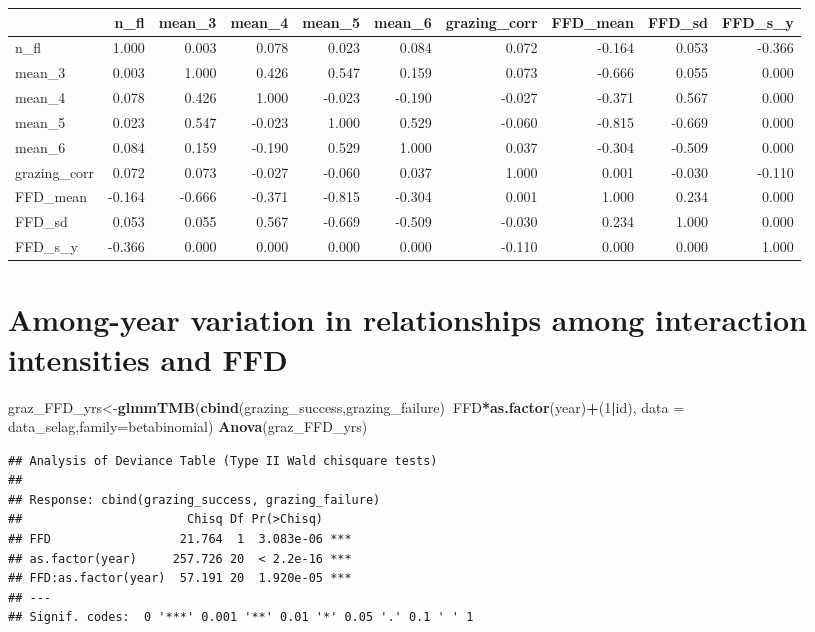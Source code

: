 \documentclass[
]{article}
\newenvironment{Shaded}{\begin{snugshade}}{\end{snugshade}}
\newcommand{\DataTypeTok}[1]{\textcolor[rgb]{0.13,0.29,0.53}{#1}}
\newcommand{\DecValTok}[1]{\textcolor[rgb]{0.00,0.00,0.81}{#1}}
\newcommand{\KeywordTok}[1]{\textcolor[rgb]{0.13,0.29,0.53}{\textbf{#1}}}
\newcommand{\NormalTok}[1]{#1}
\newcommand{\OperatorTok}[1]{\textcolor[rgb]{0.81,0.36,0.00}{\textbf{#1}}}
\begin{document}
\begin{longtable}[]{@{}lrrrrrrrrr@{}}
\toprule
& n\_fl & mean\_3 & mean\_4 & mean\_5 & mean\_6 & grazing\_corr &
FFD\_mean & FFD\_sd & FFD\_s\_y\tabularnewline
\midrule
\endhead
n\_fl & 1.000 & 0.003 & 0.078 & 0.023 & 0.084 & 0.072 & -0.164 & 0.053 &
-0.366\tabularnewline
mean\_3 & 0.003 & 1.000 & 0.426 & 0.547 & 0.159 & 0.073 & -0.666 & 0.055
& 0.000\tabularnewline
mean\_4 & 0.078 & 0.426 & 1.000 & -0.023 & -0.190 & -0.027 & -0.371 &
0.567 & 0.000\tabularnewline
mean\_5 & 0.023 & 0.547 & -0.023 & 1.000 & 0.529 & -0.060 & -0.815 &
-0.669 & 0.000\tabularnewline
mean\_6 & 0.084 & 0.159 & -0.190 & 0.529 & 1.000 & 0.037 & -0.304 &
-0.509 & 0.000\tabularnewline
grazing\_corr & 0.072 & 0.073 & -0.027 & -0.060 & 0.037 & 1.000 & 0.001
& -0.030 & -0.110\tabularnewline
FFD\_mean & -0.164 & -0.666 & -0.371 & -0.815 & -0.304 & 0.001 & 1.000 &
0.234 & 0.000\tabularnewline
FFD\_sd & 0.053 & 0.055 & 0.567 & -0.669 & -0.509 & -0.030 & 0.234 &
1.000 & 0.000\tabularnewline
FFD\_s\_y & -0.366 & 0.000 & 0.000 & 0.000 & 0.000 & -0.110 & 0.000 &
0.000 & 1.000\tabularnewline
\bottomrule
\end{longtable}

\hypertarget{among-year-variation-in-relationships-among-interaction-intensities-and-ffd}{%
\section{Among-year variation in relationships among interaction
intensities and
FFD}\label{among-year-variation-in-relationships-among-interaction-intensities-and-ffd}}

\begin{Shaded}
\begin{Highlighting}[]
\NormalTok{graz_FFD_yrs<-}\KeywordTok{glmmTMB}\NormalTok{(}\KeywordTok{cbind}\NormalTok{(grazing_success,grazing_failure)}\OperatorTok{~}\NormalTok{FFD}\OperatorTok{*}\KeywordTok{as.factor}\NormalTok{(year)}\OperatorTok{+}\NormalTok{(}\DecValTok{1}\OperatorTok{|}\NormalTok{id),}
                      \DataTypeTok{data =}\NormalTok{ data_selag,}\DataTypeTok{family=}\NormalTok{betabinomial)}
\KeywordTok{Anova}\NormalTok{(graz_FFD_yrs)}
\end{Highlighting}
\end{Shaded}

\begin{verbatim}
## Analysis of Deviance Table (Type II Wald chisquare tests)
## 
## Response: cbind(grazing_success, grazing_failure)
##                       Chisq Df Pr(>Chisq)    
## FFD                  21.764  1  3.083e-06 ***
## as.factor(year)     257.726 20  < 2.2e-16 ***
## FFD:as.factor(year)  57.191 20  1.920e-05 ***
## ---
## Signif. codes:  0 '***' 0.001 '**' 0.01 '*' 0.05 '.' 0.1 ' ' 1
\end{verbatim}
\end{document}
